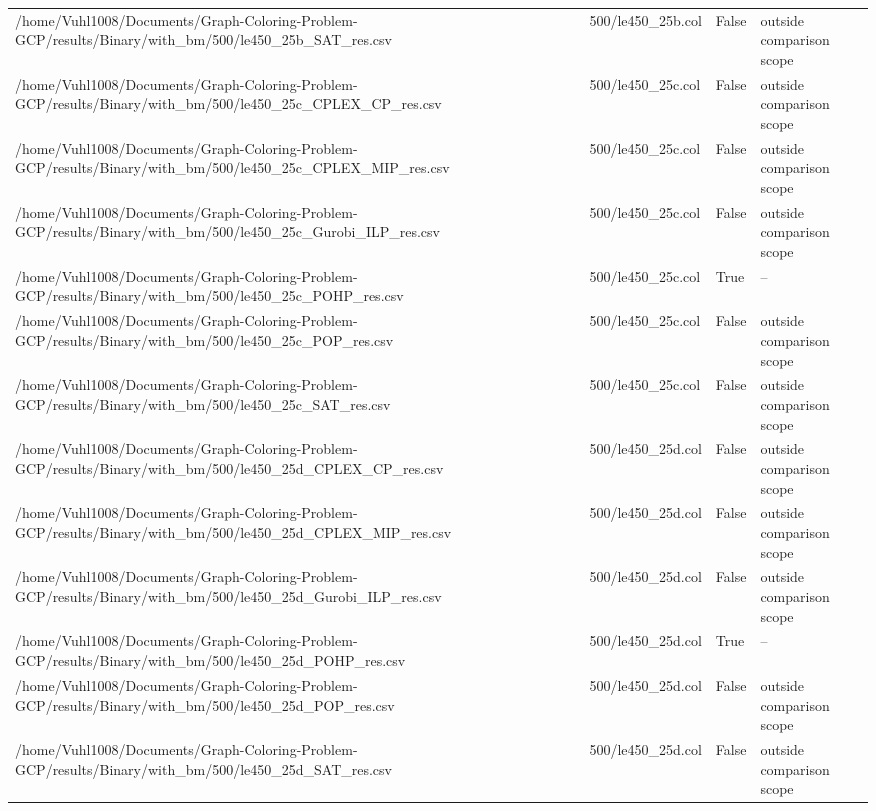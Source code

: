\begin{table}[htbp]
\begin{tabular}{llll}
/home/Vuhl1008/Documents/Graph-Coloring-Problem-GCP/results/Binary/with\_bm/500/le450\_25b\_SAT\_res.csv & 500/le450\_25b.col & False & outside comparison scope \\
/home/Vuhl1008/Documents/Graph-Coloring-Problem-GCP/results/Binary/with\_bm/500/le450\_25c\_CPLEX\_CP\_res.csv & 500/le450\_25c.col & False & outside comparison scope \\
/home/Vuhl1008/Documents/Graph-Coloring-Problem-GCP/results/Binary/with\_bm/500/le450\_25c\_CPLEX\_MIP\_res.csv & 500/le450\_25c.col & False & outside comparison scope \\
/home/Vuhl1008/Documents/Graph-Coloring-Problem-GCP/results/Binary/with\_bm/500/le450\_25c\_Gurobi\_ILP\_res.csv & 500/le450\_25c.col & False & outside comparison scope \\
/home/Vuhl1008/Documents/Graph-Coloring-Problem-GCP/results/Binary/with\_bm/500/le450\_25c\_POHP\_res.csv & 500/le450\_25c.col & True & -- \\
/home/Vuhl1008/Documents/Graph-Coloring-Problem-GCP/results/Binary/with\_bm/500/le450\_25c\_POP\_res.csv & 500/le450\_25c.col & False & outside comparison scope \\
/home/Vuhl1008/Documents/Graph-Coloring-Problem-GCP/results/Binary/with\_bm/500/le450\_25c\_SAT\_res.csv & 500/le450\_25c.col & False & outside comparison scope \\
/home/Vuhl1008/Documents/Graph-Coloring-Problem-GCP/results/Binary/with\_bm/500/le450\_25d\_CPLEX\_CP\_res.csv & 500/le450\_25d.col & False & outside comparison scope \\
/home/Vuhl1008/Documents/Graph-Coloring-Problem-GCP/results/Binary/with\_bm/500/le450\_25d\_CPLEX\_MIP\_res.csv & 500/le450\_25d.col & False & outside comparison scope \\
/home/Vuhl1008/Documents/Graph-Coloring-Problem-GCP/results/Binary/with\_bm/500/le450\_25d\_Gurobi\_ILP\_res.csv & 500/le450\_25d.col & False & outside comparison scope \\
/home/Vuhl1008/Documents/Graph-Coloring-Problem-GCP/results/Binary/with\_bm/500/le450\_25d\_POHP\_res.csv & 500/le450\_25d.col & True & -- \\
/home/Vuhl1008/Documents/Graph-Coloring-Problem-GCP/results/Binary/with\_bm/500/le450\_25d\_POP\_res.csv & 500/le450\_25d.col & False & outside comparison scope \\
/home/Vuhl1008/Documents/Graph-Coloring-Problem-GCP/results/Binary/with\_bm/500/le450\_25d\_SAT\_res.csv & 500/le450\_25d.col & False & outside comparison scope \\

\end{tabular}
\end{table}
